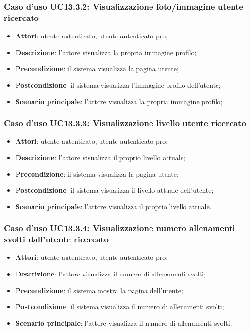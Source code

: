 \subsubsection{Caso d'uso UC13.3.2: Visualizzazione foto/immagine utente ricercato}
\begin{itemize}
	\item\textbf{Attori}: utente autenticato, utente autenticato pro;
	\item\textbf{Descrizione}: l'attore visualizza la propria immagine profilo;
	\item\textbf{Precondizione}: il sistema visualizza la pagina utente;
	\item\textbf{Postcondizione}: il sistema visualizza l'immagine profilo dell'utente;
	\item\textbf{Scenario principale}: l'attore visualizza la propria immagine profilo;
\end{itemize}

\subsubsection{Caso d'uso UC13.3.3: Visualizzazione livello utente ricercato}
\begin{itemize}
	\item\textbf{Attori}: utente autenticato, utente autenticato pro;
	\item\textbf{Descrizione}: l'attore visualizza il proprio livello attuale;
	\item\textbf{Precondizione}: il sistema visualizza la pagina utente;
	\item\textbf{Postcondizione}: il sistema visualizza il livello attuale dell'utente;
	\item\textbf{Scenario principale}: l'attore visualizza il proprio livello attuale.
\end{itemize}

\subsubsection{Caso d'uso UC13.3.4: Visualizzazione numero allenamenti svolti dall'utente ricercato}
\begin{itemize}
	\item\textbf{Attori}: utente autenticato, utente autenticato pro;
	\item\textbf{Descrizione}: l'attore visualizza il numero di allenamenti svolti;
	\item\textbf{Precondizione}: il sistema mostra la pagina dell'utente;
	\item\textbf{Postcondizione}: il sistema visualizza il numero di allenamenti svolti;
	\item\textbf{Scenario principale}: l'attore visualizza il numero di allenamenti svolti.
\end{itemize}


